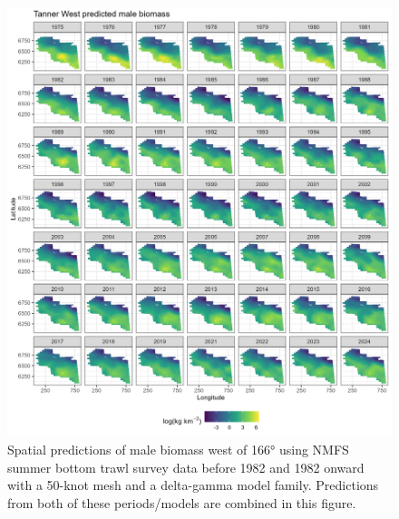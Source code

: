 \documentclass[
]{article}
\begin{document}
\begin{figure}

{\centering \includegraphics[width=1\linewidth,height=1\textheight]{../BAIRDI/Figures/TannerW_male_spatbio} 

}

\caption{Spatial predictions of male biomass west of 166° using NMFS summer bottom trawl survey data before 1982 and 1982 onward with a 50-knot mesh and a delta-gamma model family. Predictions from both of these periods/models are combined in this figure.}\label{fig:spatpred-bio-50-maleW}
\end{figure}
\end{document}
